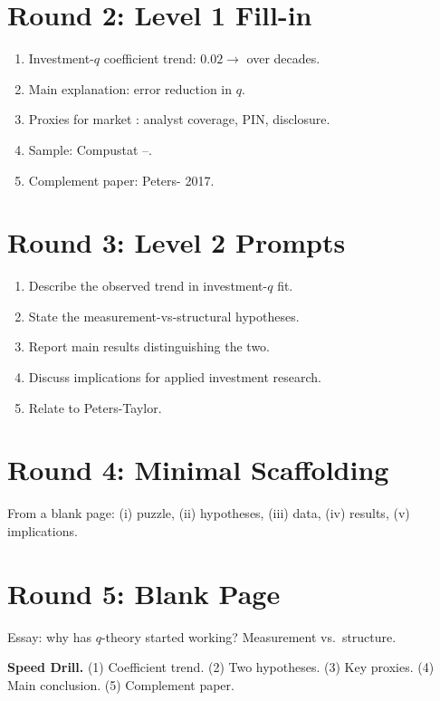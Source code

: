 \documentclass[11pt]{article}
\newcommand{\blank}[1]{\underline{\hspace{#1}}}
\begin{document}
\section*{Round 2: Level 1 Fill-in}
\begin{enumerate}
\item Investment-$q$ coefficient trend: $0.02\to$\blank{1cm} over decades.
\item Main explanation: \blank{2cm} error reduction in $q$.
\item Proxies for market \blank{2cm}: analyst coverage, PIN, disclosure.
\item Sample: Compustat \blank{1cm}--\blank{1cm}.
\item Complement paper: Peters-\blank{1cm} 2017.
\end{enumerate}

\section*{Round 3: Level 2 Prompts}
\begin{enumerate}
\item Describe the observed trend in investment-$q$ fit.
\item State the measurement-vs-structural hypotheses.
\item Report main results distinguishing the two.
\item Discuss implications for applied investment research.
\item Relate to Peters-Taylor.
\end{enumerate}

\section*{Round 4: Minimal Scaffolding}
From a blank page: (i) puzzle, (ii) hypotheses, (iii) data, (iv) results, (v) implications.

\section*{Round 5: Blank Page}
Essay: why has $q$-theory started working? Measurement vs.\ structure.

\vspace{6pt}
\begin{drillbox}
\textbf{Speed Drill.} (1) Coefficient trend. (2) Two hypotheses. (3) Key proxies. (4) Main conclusion. (5) Complement paper.
\end{drillbox}
\end{document}

